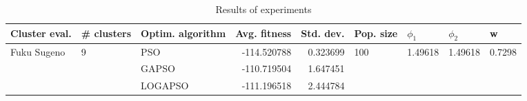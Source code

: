 \begin{table}
\centering
\caption{Results of experiments}
\begin{tabular}{lllrrllll}
\toprule
               Cluster eval. &        \# clusters & Optim. algorithm &  Avg. fitness &  Std. dev. &            Pop. size &               $\phi_{1}$ &               $\phi_{2}$ &                       w \\
\midrule
\multirow{3}{*}{Fuku Sugeno} & \multirow{3}{*}{9} &              PSO &   -114.520788 &   0.323699 & \multirow{3}{*}{100} & \multirow{3}{*}{1.49618} & \multirow{3}{*}{1.49618} & \multirow{3}{*}{0.7298} \\
                             &                    &            GAPSO &   -110.719504 &   1.647451 &                      &                          &                          &                         \\
                             &                    &          LOGAPSO &   -111.196518 &   2.444784 &                      &                          &                          &                         \\
\bottomrule
\end{tabular}
\end{table}
